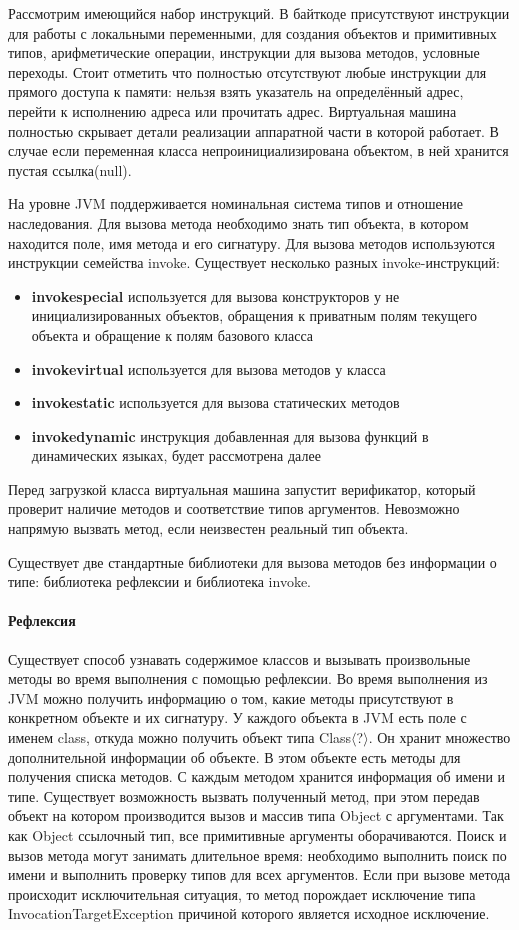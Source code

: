 Рассмотрим имеющийся набор инструкций. В байткоде присутствуют инструкции для работы с локальными переменными, для создания объектов и примитивных типов, арифметические операции, инструкции для вызова методов, условные переходы. Стоит отметить что полностью отсутствуют любые инструкции для прямого доступа к памяти: нельзя взять указатель на определённый адрес, перейти к исполнению адреса или прочитать адрес. Виртуальная машина полностью скрывает детали реализации аппаратной части в которой работает. В случае если переменная класса непроинициализирована объектом, в ней хранится пустая ссылка(null).

На уровне JVM поддерживается номинальная система типов и отношение наследования. Для вызова метода необходимо знать тип объекта, в котором находится поле, имя метода и его сигнатуру. Для вызова методов используются инструкции семейства invoke. Существует несколько разных invoke-инструкций:
\begin{itemize}
    \item \textbf{invokespecial} используется для вызова конструкторов у не инициализированных объектов, обращения к приватным полям текущего объекта и обращение к полям базового класса
    \item \textbf{invokevirtual} используется для вызова методов у класса
    \item \textbf{invokestatic} используется для вызова статических методов
    \item \textbf{invokedynamic} инструкция добавленная для вызова функций в динамических языках, будет рассмотрена далее
\end{itemize}
Перед загрузкой класса виртуальная машина запустит верификатор, который проверит наличие методов и соответствие типов аргументов. Невозможно напрямую вызвать метод, если неизвестен реальный тип объекта.

Существует две стандартные библиотеки для вызова методов без информации о типе: библиотека рефлексии и библиотека invoke.
\paragraph{Рефлексия}
Существует способ узнавать содержимое классов и вызывать произвольные методы во время выполнения с помощью рефлексии\cite{jvm:reflection}. Во время выполнения из JVM можно получить информацию о том, какие методы присутствуют в конкретном объекте и их сигнатуру. У каждого объекта в JVM есть поле с именем class, откуда можно получить объект типа Class$\langle$?$\rangle$. Он хранит множество дополнительной информации об объекте. В этом объекте есть методы для получения списка методов. С каждым методом хранится информация об имени и типе. Существует возможность вызвать полученный метод, при этом передав объект на котором производится вызов и массив типа Object с аргументами. Так как Object ссылочный тип, все примитивные аргументы оборачиваются. Поиск и вызов метода могут занимать длительное время: необходимо выполнить поиск по имени и выполнить проверку типов для всех аргументов. Если при вызове метода происходит исключительная ситуация, то метод порождает исключение типа InvocationTargetException причиной которого является исходное исключение.

